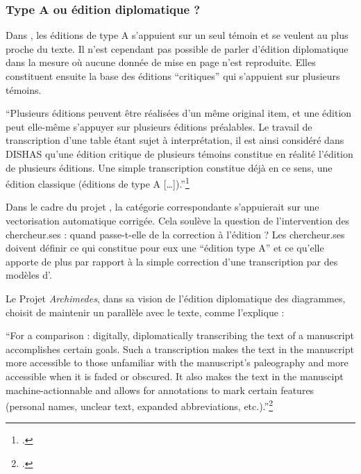 \hypertarget{type-a-ou-edition-diplomatique}{%
\subsubsection{Type A ou édition diplomatique
?}\label{type-a-ou-edition-diplomatique}}

Dans \dishas, les éditions de type A s'appuient sur un seul témoin et se
veulent au plus proche du texte. Il n'est cependant pas possible de
parler d'édition diplomatique dans la mesure où aucune donnée de mise en
page n'est reproduite. Elles constituent ensuite la base des éditions
``critiques'' qui s'appuient sur plusieurs témoins.

\begin{kwote}
``Plusieurs éditions peuvent être réalisées d'un même original item, et
une édition peut elle-même s'appuyer sur plusieurs éditions préalables.
Le travail de transcription d'une table étant sujet à interprétation, il
est ainsi considéré dans DISHAS qu'une édition critique de plusieurs
témoins constitue en réalité l'édition de plusieurs éditions. Une simple
transcription constitue déjà en ce sens, une édition classique (éditions
de type A {[}\ldots{]}).''\footcite[p.24]{albouy_mediation_2019}
\end{kwote}

Dans le cadre du projet \eida, la catégorie correspondante s'appuierait
sur une vectorisation automatique corrigée. Cela soulève la question de
l'intervention des chercheur.ses : quand passe-t-elle de la correction à
l'édition ? Les chercheur.ses doivent définir ce qui constitue pour eux une
``édition type A'' et ce qu'elle apporte de plus par rapport à la simple
correction d'une transcription par des modèles d'\ia.

Le Projet \textit{Archimedes}, dans sa vision de l'édition diplomatique des
diagrammes, choisit de maintenir un parallèle avec le texte, comme
l'explique \citeauthor{roughan_digital_2014} :

\begin{kwote}
``For a comparison : digitally, diplomatically transcribing the text of
a manuscript accomplishes certain goals. Such a transcription makes the
text in the manuscript more accessible to those unfamiliar with the
manuscript's paleography and more accessible when it is faded or
obscured. It also makes the text in the manuscipt machine-actionnable
and allows for annotations to mark certain features (personal names,
unclear text, expanded abbreviations, etc.).''\footcite[p.78]{roughan_digital_2014}
\end{kwote}

